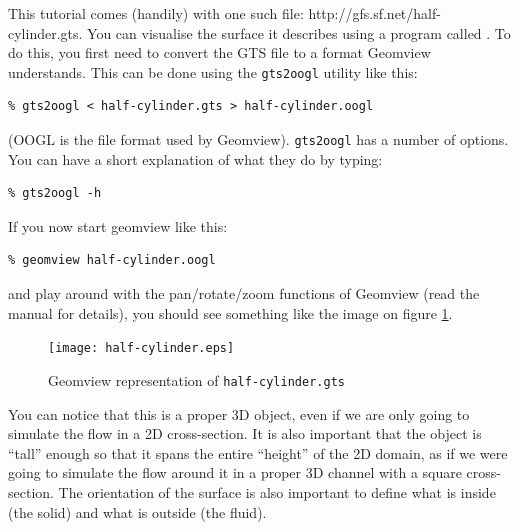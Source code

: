 \documentclass[a4paper]{article}
\newcommand{\gfsweb}{http://gfs.sf.net}
\begin{document}
This tutorial comes (handily) with one such file:
{\gfsweb/half-cylinder.gts}. You can
visualise the surface it describes using a program
called
. To do this,
you first need to convert the {\sc GTS} file to a format Geomview
understands. This can be done using the {\tt gts2oogl} utility like
this:
\begin{verbatim}
% gts2oogl < half-cylinder.gts > half-cylinder.oogl
\end{verbatim}
({\sc OOGL} is the file format used by Geomview). {\tt gts2oogl} has a
number of options. You can have a short explanation of what they do by 
typing:
\begin{verbatim}
% gts2oogl -h
\end{verbatim}
If you now start geomview like this:
\begin{verbatim}
% geomview half-cylinder.oogl
\end{verbatim}
and play around with the pan/rotate/zoom functions of Geomview (read the
manual for details), you should see something like the image on figure 
\ref{half-cylinder}.
\begin{figure}[htbp]
\begin{center}
\texttt{[image: half-cylinder.eps]}
\end{center}
\caption{Geomview representation of {\tt half-cylinder.gts}}
\label{half-cylinder}
\end{figure}
You can notice that this is a proper 3D object, even if we are only
going to simulate the flow in a 2D cross-section. It is also important 
that the object is ``tall'' enough so that it spans the entire
``height'' of the 2D domain, as if we were going to simulate the flow
around it in a proper 3D channel with a square cross-section. The
orientation of the surface is also important to define what is inside
(the solid) and what is outside (the fluid).
\end{document}
